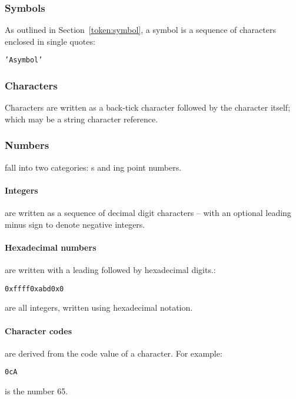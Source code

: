 \subsubsection{Symbols}
As outlined in Section~\vref{token:symbol}, a symbol is a sequence of characters enclosed in single quotes:
\begin{alltt}
'A symbol'
\end{alltt} 

\subsubsection{Characters}
\label{expression:character}

Characters are written as a back-tick character followed by the character itself; which may be a string character reference.

\subsubsection{Numbers}
\label{expression:number}

fall into two categories: s and ing point numbers.

\paragraph{Integers}
are written as a sequence of decimal digit characters -- with an optional leading minus sign to denote negative integers.

\paragraph{Hexadecimal numbers}
are written with a leading  followed by hexadecimal digits.:
\begin{alltt}
0xffff 0xabd 0x0
\end{alltt}
are all integers, written using hexadecimal notation.

\paragraph{Character codes}
are derived from the code value of a character. For example:
\begin{alltt}
0cA
\end{alltt}
is the number 65.


